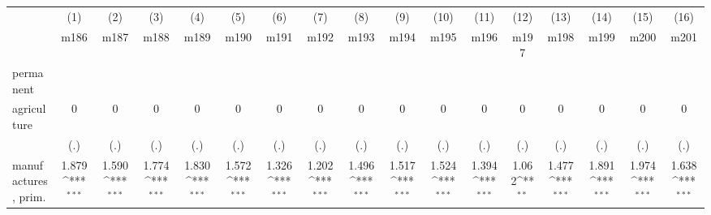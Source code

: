 {
\def\sym#1{\ifmmode^{#1}\else\(^{#1}\)\fi}
\begin{tabular}{l*{16}{c}}
\hline\hline
                    &\multicolumn{1}{c}{(1)}&\multicolumn{1}{c}{(2)}&\multicolumn{1}{c}{(3)}&\multicolumn{1}{c}{(4)}&\multicolumn{1}{c}{(5)}&\multicolumn{1}{c}{(6)}&\multicolumn{1}{c}{(7)}&\multicolumn{1}{c}{(8)}&\multicolumn{1}{c}{(9)}&\multicolumn{1}{c}{(10)}&\multicolumn{1}{c}{(11)}&\multicolumn{1}{c}{(12)}&\multicolumn{1}{c}{(13)}&\multicolumn{1}{c}{(14)}&\multicolumn{1}{c}{(15)}&\multicolumn{1}{c}{(16)}\\
                    &\multicolumn{1}{c}{m186}&\multicolumn{1}{c}{m187}&\multicolumn{1}{c}{m188}&\multicolumn{1}{c}{m189}&\multicolumn{1}{c}{m190}&\multicolumn{1}{c}{m191}&\multicolumn{1}{c}{m192}&\multicolumn{1}{c}{m193}&\multicolumn{1}{c}{m194}&\multicolumn{1}{c}{m195}&\multicolumn{1}{c}{m196}&\multicolumn{1}{c}{m197}&\multicolumn{1}{c}{m198}&\multicolumn{1}{c}{m199}&\multicolumn{1}{c}{m200}&\multicolumn{1}{c}{m201}\\
\hline
permanent           &                     &                     &                     &                     &                     &                     &                     &                     &                     &                     &                     &                     &                     &                     &                     &                     \\
agriculture         &           0         &           0         &           0         &           0         &           0         &           0         &           0         &           0         &           0         &           0         &           0         &           0         &           0         &           0         &           0         &           0         \\
                    &         (.)         &         (.)         &         (.)         &         (.)         &         (.)         &         (.)         &         (.)         &         (.)         &         (.)         &         (.)         &         (.)         &         (.)         &         (.)         &         (.)         &         (.)         &         (.)         \\
[1em]
manufactures, prim. &       1.879\sym{***}&       1.590\sym{***}&       1.774\sym{***}&       1.830\sym{***}&       1.572\sym{***}&       1.326\sym{***}&       1.202\sym{***}&       1.496\sym{***}&       1.517\sym{***}&       1.524\sym{***}&       1.394\sym{***}&       1.062\sym{**} &       1.477\sym{***}&       1.891\sym{***}&       1.974\sym{***}&       1.638\sym{***}\\

\end{tabular}}
